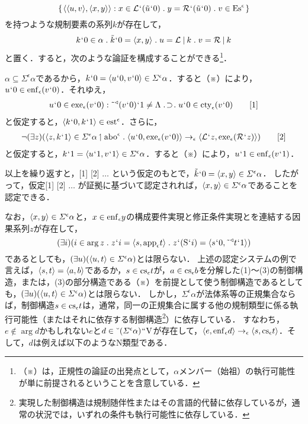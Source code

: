 \[
    \classab{\orp{\orp{u,v},\orp{x,y}}:
    x\in \mathcal{L}\fap(\tilde{u}\fap 0)\con{1}y = \mathcal{R}\fap(\tilde{u}\fap 0)\con{1}v\in\mathrm{Es}^\epsilon
    }
\]
を持つような規制要素の系列$ k $が存在して，
\[
    k\fap 0 \in\alpha\con{1}\tilde{k}\fap 0 = \orp{x,y}\con{1}u = \mathcal{L}\resl k\con{1}v = \mathcal{R}\resl k
\]
と置く．すると，次のような論証を構成することができる\footnote{
    （※）は，正規性の論証の出発点として，$ \alpha $メンバー（始祖）の執行可能性が単に前提されるということを含意している．
}．
\begin{nom}
    \setcounter{equation}{0}
$ \alpha\subseteq\varSigma^{\epsilon}\alpha $であるから，$ k{\mspace{1mu}{`}\mspace{1mu}} 0 =\langle u{\mspace{1mu}{`}\mspace{1mu}} 0,v{\mspace{1mu}{`}\mspace{1mu}} 0 \rangle\in\varSigma^{\epsilon}\alpha $．すると（※）により，
    $ u{\mspace{1mu}{`}\mspace{1mu}} 0\in\mathrm{enf}_{\epsilon}(v{\mspace{1mu}{`}\mspace{1mu}} 0) $．それゆえ，
    \begin{align}
        u\fap 0\in\exe{\epsilon}{(v\fap 0)}\con{2}
        \tildel{\trgl{(v\fap 0)}}\fap 1\neq\Lambda\case{1}{1}{1}
        u\fap 0\in\cty{\epsilon}(v\fap 0)
        \tag*{[1]}
    \end{align}
    と仮定すると，$ \langle k{\mspace{1mu}{`}\mspace{1mu}} 0,k{\mspace{1mu}{`}\mspace{1mu}} 1 \rangle\in\mathrm{est}^\epsilon $．さらに，
    \begin{align}
        \neg(\exists z)(\orp{z,k\fap 1}\in \varSigma^{\epsilon}\alpha\uphl\mathrm{abo}^\epsilon\con{1}
        \orp{u\fap 0,\exe{\epsilon}{(v\fap 0)}}\to_{\epsilon}\orp{\mathcal{L}\fap z,\exe{\epsilon}{(\mathcal{R}\fap z)}}
        )
        \tag*{[2]}
    \end{align}
    と仮定すると，$ k{\mspace{1mu}{`}\mspace{1mu}} 1 = \langle u{\mspace{1mu}{`}\mspace{1mu}} 1,v{\mspace{1mu}{`}\mspace{1mu}} 1 \rangle\in \varSigma^{\epsilon}\alpha $．すると（※）により，$ u{\mspace{1mu}{`}\mspace{1mu}} 1\in\mathrm{enf}_{\epsilon}(v{\mspace{1mu}{`}\mspace{1mu}} 1) $．
    
    以上を繰り返すと，[1] [2] $\dots$ という仮定のもとで，$ \tilde{k}{\mspace{1mu}{`}\mspace{1mu}} 0 = \langle x,y \rangle\in \varSigma^{\epsilon}\alpha $．
    したがって，仮定[1] [2] $\dots$ が証拠に基づいて認定されれば，$ \langle x,y \rangle\in \varSigma^{\epsilon}\alpha $であることを認定できる．
\end{nom}

なお，$ \langle x,y \rangle\in \varSigma^{\epsilon}\alpha $と，$ x\in\mathrm{enf}_{\epsilon}y $の構成要件実現と修正条件実現とを連結する因果系列$ z $が存在して，
\[
    (\exists i)(
        i\in\arg z \con{1}z\fap i = \orp{s,\app{\epsilon} t}\con{1}z\fap(\mathrm{S}\fap i)= \orp{s\fap 0,\tildel{\trgl{t}}\fap 1}
    )
\]
であるとしても，$ (\exists u)(\langle u,t \rangle\in \varSigma^{\epsilon}\alpha) $とは限らない．
上述の認定システムの例で言えば，$ \langle s,t \rangle=\langle a,b \rangle $であるか，$ s\in\mathrm{cs}_{\epsilon}t $が，$ a\in\mathrm{cs}_{\epsilon}b $を分解した(1)〜(3)の制御構造，または，(3)の部分構造である（※）を前提として使う制御構造であるとしても，$ (\exists u)(\langle u,t \rangle\in \varSigma^{\epsilon}\alpha) $とは限らない．
しかし，$ \varSigma^{\epsilon}\alpha $が法体系等の正規集合ならば，制御構造$ s\in\mathrm{cs}_{\epsilon}t $は，通常，同一の正規集合に属する他の規制類型に係る執行可能性（またはそれに依存する制御構造\footnote{実現した制御構造は規制随伴性またはその言語的代替に依存しているが，通常の状況では，いずれの条件も執行可能性に依存している．}）に依存している．
すなわち，$ e\notin\arg d $かもしれない$ e $と$ d\in \breve{\:\:}(\varSigma^{\epsilon}\alpha){\mspace{1mu}{``}\mspace{1mu}}\mathrm{V} $が存在して，$ \langle e,\mathrm{enf}_{\epsilon}d \rangle\to_{\epsilon}\langle s,\mathrm{cs}_{\epsilon}t \rangle $．そして，$ d $は例えば以下のようなN類型である．

